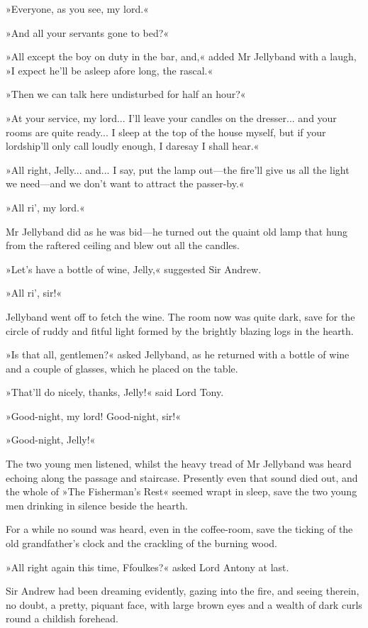 »Everyone, as you see, my lord.«

»And all your servants gone to bed?«

»All except the boy on duty in the bar, and,« added Mr Jellyband with a laugh, »I expect he'll be asleep afore long, the rascal.«

»Then we can talk here undisturbed for half an hour?«

»At your service, my lord... I'll leave your candles on the dresser... and your rooms are quite ready... I sleep at the top of the house myself, but if your lordship'll only call loudly enough, I daresay I shall hear.«

»All right, Jelly... and... I say, put the lamp out\allowbreak---\allowbreak the fire'll give us all the light we need\allowbreak---\allowbreak and we don't want to attract the passer-by.«

»All ri', my lord.«

Mr Jellyband did as he was bid\allowbreak---\allowbreak he turned out the quaint old lamp that hung from the raftered ceiling and blew out all the candles.

»Let's have a bottle of wine, Jelly,« suggested Sir Andrew.

»All ri', sir!«

Jellyband went off to fetch the wine. The room now was quite dark, save for the circle of ruddy and fitful light formed by the brightly blazing logs in the hearth.

»Is that all, gentlemen?« asked Jellyband, as he returned with a bottle of wine and a couple of glasses, which he placed on the table.

»That'll do nicely, thanks, Jelly!« said Lord Tony.

»Good-night, my lord! Good-night, sir!«

»Good-night, Jelly!«

The two young men listened, whilst the heavy tread of Mr Jellyband was heard echoing along the passage and staircase. Presently even that sound died out, and the whole of »The Fisherman's Rest« seemed wrapt in sleep, save the two young men drinking in silence beside the hearth.

For a while no sound was heard, even in the coffee-room, save the ticking of the old grandfather's clock and the crackling of the burning wood.

»All right again this time, Ffoulkes?« asked Lord Antony at last.

Sir Andrew had been dreaming evidently, gazing into the fire, and seeing therein, no doubt, a pretty, piquant face, with large brown eyes and a wealth of dark curls round a childish forehead.

